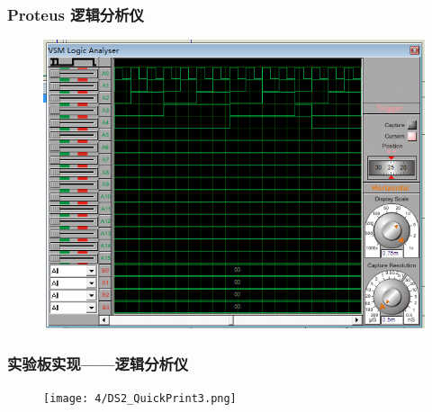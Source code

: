 \documentclass{article}
\begin{document}
\newpage

\subsubsection{Proteus 逻辑分析仪}

\begin{figure}[!hbp]
  \centering
  \includegraphics[scale=0.5]{4/2.png}
\end{figure}

\subsubsection{实验板实现——逻辑分析仪}

\begin{figure}[!hbp]
  \centering
  \texttt{[image: 4/DS2\_QuickPrint3.png]}
\end{figure}
\end{document}
